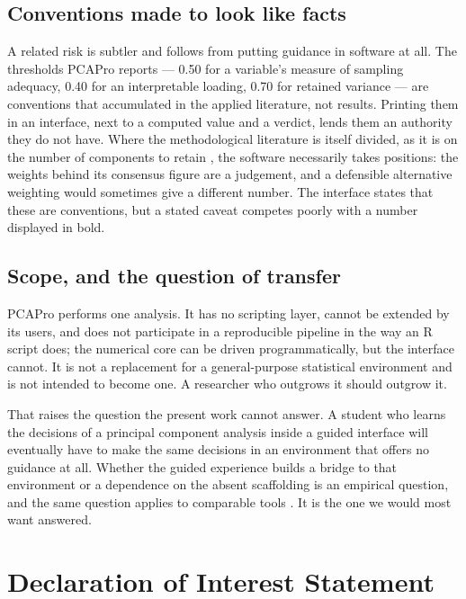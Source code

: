 \documentclass[12pt]{article}
\begin{document}
\subsection{Conventions made to look like facts}

A related risk is subtler and follows from putting guidance in software at all.
The thresholds PCAPro reports --- 0.50 for a variable's measure of sampling
adequacy, 0.40 for an interpretable loading, 0.70 for retained variance --- are
conventions that accumulated in the applied literature, not results. Printing
them in an interface, next to a computed value and a verdict, lends them an
authority they do not have. Where the methodological literature is itself
divided, as it is on the number of components to retain
\citep{jolliffe2016, greenacre2022}, the software necessarily takes positions:
the weights behind its consensus figure are a judgement, and a defensible
alternative weighting would sometimes give a different number. The interface
states that these are conventions, but a stated caveat competes poorly with a
number displayed in bold.

\subsection{Scope, and the question of transfer}

PCAPro performs one analysis. It has no scripting layer, cannot be extended by
its users, and does not participate in a reproducible pipeline in the way an R
script does; the numerical core can be driven programmatically, but the
interface cannot. It is not a replacement for a general-purpose statistical
environment and is not intended to become one. A researcher who outgrows it
should outgrow it.

That raises the question the present work cannot answer. A student who learns
the decisions of a principal component analysis inside a guided interface will
eventually have to make the same decisions in an environment that offers no
guidance at all. Whether the guided experience builds a bridge to that
environment or a dependence on the absent scaffolding is an empirical question,
and the same question applies to comparable tools \citep{reinhart2025,
sidou2020}. It is the one we would most want answered.

\section*{Declaration of Interest Statement}
\end{document}
